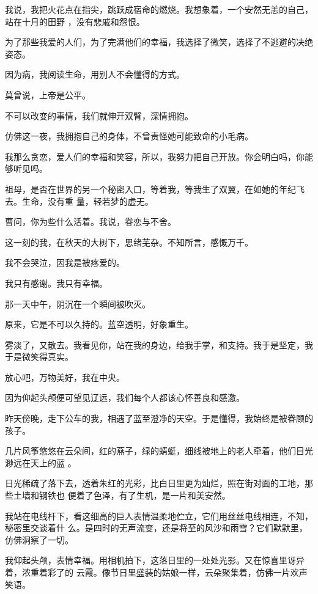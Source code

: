 \documentclass[12pt,a4paper]{article}
\begin{document}
		我说，我把火花点在指尖，跳跃成宿命的燃烧。我想象着，一个安然无恙的自己，站在十月的田野
	，没有悲戚和怨恨。

		为了那些我爱的人们，为了完满他们的幸福，我选择了微笑，选择了不逃避的决绝姿态。


		因为病，我阅读生命，用别人不会懂得的方式。

		莫曾说，上帝是公平。


		不可以改变的事情，我们就伸开双臂，深情拥抱。

		仿佛这一夜，我拥抱自己的身体，不曾责怪她可能致命的小毛病。

		我那么贪恋，爱人们的幸福和笑容，所以，我努力把自己开放。你会明白吗，你能够听见吗。

		祖母，是否在世界的另一个秘密入口，等着我，等我生了双翼，在如她的年纪飞去。生命，没有重
	量，轻若梦的虚无。


		曹问，你为些什么活着。我说，眷恋与不舍。

		这一刻的我，在秋天的大树下，思绪芜杂。不知所言，感慨万千。

		我不会哭泣，因我是被疼爱的。

		我只有感谢。我只有幸福。


		那一天中午，阴沉在一个瞬间被吹灭。

		原来，它是不可以久持的。蓝空透明，好象重生。

		雾淡了，又散去。我看见你，站在我的身边，给我手掌，和支持。我于是坚定，我于是微笑得真实。


		放心吧，万物美好，我在中央。

	\endwriting



		因为仰起头颅便可望见辽远，我们每个人都该心怀善良和感激。


		昨天傍晚，走下公车的我，相遇了蓝至澄净的天空。于是懂得，我始终是被眷顾的孩子。

		几片风筝悠悠在云朵间，红的燕子，绿的蜻蜓，细线被地上的老人牵着，他们目光渺远在天上的蓝
	。

		日光稀疏了落下去，透着朱红的光彩，比白日里更为灿烂，照在街对面的工地，那些土墙和钢铁也
	便着了色泽，有了生机，是一片和美安然。

		我站在电线杆下，看这细高的巨人表情温柔地伫立，它们用丝丝电线相连，不知，秘密里交谈着什
	么。是四时的无声流变，还是将至的风沙和雨雪？它们默默里，仿佛洞察了一切。


		我仰起头颅，表情幸福。用相机拍下，这落日里的一处处光影。又在惊喜里讶异着，浓重着彩了的
	云霞。像节日里盛装的姑娘一样，云朵聚集着，仿佛一片欢声笑语。
\end{document}
